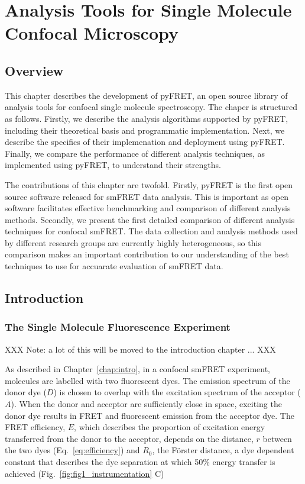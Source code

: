 \chapter{Analysis Tools for Single Molecule Confocal Microscopy}
\section{Overview}
This chapter describes the development of pyFRET, an open source library of analysis tools for confocal single molecule spectroscopy. The chaper is structured as follows. Firstly, we describe the analysis algorithms supported by pyFRET, including their theoretical basis and programmatic implementation. Next, we describe the specifics of their implemenation and deployment using pyFRET. Finally, we compare the performance of different analysis techniques, as implemented using pyFRET, to understand their strengths. 

The contributions of this chapter are twofold. Firstly, pyFRET is the first open source software released for smFRET data analysis. This is important as open software facilitates effective benchmarking and comparison of different analysis methods. Secondly, we present the first detailed comparison of different analysis techniques for confocal smFRET. The data collection and analysis methods used by different research groups are currently highly heterogeneous, so this comparison makes an important contribution to our understanding of the best techniques to use for accuarate evaluation of smFRET data.  

\section{Introduction}
\subsection{The Single Molecule Fluorescence Experiment}

XXX Note: a lot of this will be moved to  the introduction chapter ... XXX

As described in Chapter~\ref{chap:intro}, in a confocal smFRET experiment, molecules are labelled with two fluorescent dyes. The emission spectrum of the donor dye ($D$) is chosen to overlap with the excitation spectrum of the acceptor ($A$). When the donor and acceptor are sufficiently close in space, exciting the donor dye results in FRET and fluorescent emission from the acceptor dye. The FRET efficiency, $E$, which describes the proportion of excitation energy transferred from the donor to the acceptor, depends on the distance, $r$ between the two dyes (Eq.~\ref{eq:efficiency}) and $R_0$, the F\"{o}rster distance, a dye dependent constant that describes the dye separation at which 50\% energy transfer is achieved (Fig.~\ref{fig:fig1_instrumentation} C)

